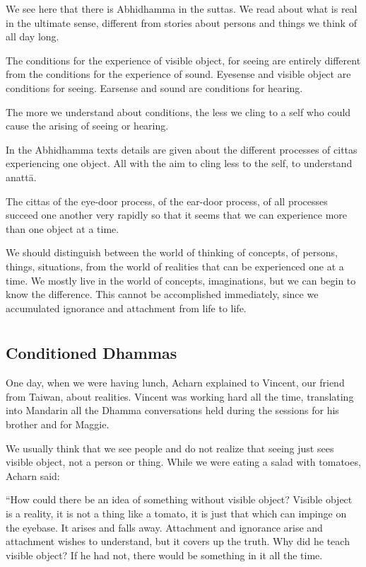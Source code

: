 We see here that there is Abhidhamma in the suttas. We read about what is real 
in the ultimate sense, different from stories about persons and things we think of 
all day long. 

The conditions for the experience of visible object, for seeing are entirely different from the conditions for the experience of sound. Eyesense and visible object are conditions for seeing. Earsense and sound are conditions for hearing. 

The more we understand about conditions, the less we cling to a self who could 
cause the arising of seeing or hearing. 

In the Abhidhamma texts details are given about the different processes of cittas 
experiencing one object. All with the aim to cling less to the self, to understand 
anattā. 

The cittas of the eye-door process, of the ear-door process, of all processes succeed one another very rapidly so that it seems that we can experience more than 
one object at a time. 

We should distinguish between the world of thinking of concepts, of persons, 
things, situations, from the world of realities that can be experienced one at a 
time. We mostly live in the world of concepts, imaginations, but we can begin 
to know the difference. This cannot be accomplished immediately, since we accumulated ignorance and attachment from life to life. 



\chapter[Conditioned Dhammas]{}
\section*{Conditioned Dhammas} 

One day, when we were having lunch, Acharn explained to Vincent, our friend 
from Taiwan, about realities. Vincent was working hard all the time, translating 
into Mandarin all the Dhamma conversations held during the sessions for his 
brother and for Maggie. 

We usually think that we see people and do not realize that seeing just sees visible object, not a person or thing. While we were eating a salad with tomatoes, 
Acharn said: 

``How could there be an idea of something without visible object? Visible object 
is a reality, it is not a thing like a tomato, it is just that which can impinge on the 
eyebase. It arises and falls away. Attachment and ignorance arise and attachment wishes to understand, but it covers up the truth. Why did he teach visible 
object? If he had not, there would be something in it all the time. 

